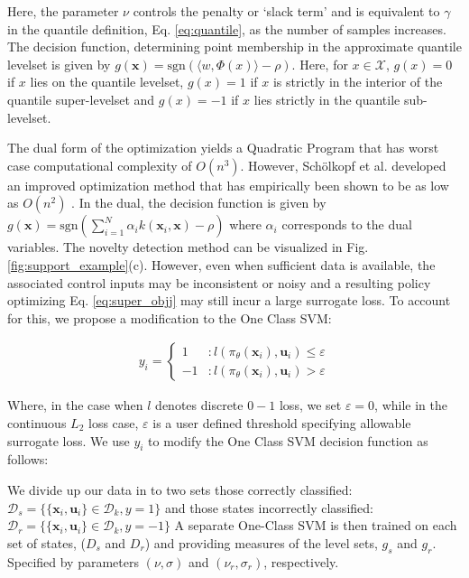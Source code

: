\documentclass[10pt, conference]{ieeeconf}      %
\newcommand{\bu}{\mathbf{u}}
\newcommand{\bx}{\mathbf{x}}
\begin{document}
Here, the parameter $\nu$ controls the penalty or `slack term' and is equivalent to $\gamma$ \cite{vert2006consistency}
in the quantile definition, Eq. \ref{eq:quantile}, as the number of samples increases. The decision
function, determining point membership in the approximate quantile levelset is given by $g(\bx) = \mbox{sgn}(\langle w,\Phi(x) \rangle-\rho)$. Here, for $x\in \mathcal{X}$, $g(x)=0$ if $x$ lies on the quantile levelset,
$g(x) = 1$ if $x$ is strictly in the interior of the quantile super-levelset and $g(x) = -1$ 
if $x$ lies strictly in the quantile sub-levelset. 



The dual form of the optimization yields a Quadratic Program 
that has worst case computational complexity of $O(n^3)$. However, Sch{\"o}lkopf et al. developed an improved optimization method that has empirically been shown to be as low as $O(n^2)$ \cite{scholkopf2001estimating}. In the dual, the decision function is given by $g(\bx) = \mbox{sgn}(\sum^N_{i=1}\alpha_i k(\bx_i,\bx)-\rho)$ where $\alpha_i$ corresponds to the dual variables.  The novelty detection method can be visualized in Fig. \ref{fig:support_example}(c). 
However, even when sufficient data is available, the associated control inputs may be inconsistent or noisy and a resulting policy
optimizing Eq. \ref{eq:super_objj} may still incur a large surrogate loss. To account for this, we propose a
modification to the One Class SVM:

\vspace{-2ex}
\begin{align}
y_i = \left\{
     \begin{array}{lr}
         1 & : l(\pi_{\theta}(\bx_i),\bu_i)\le \varepsilon\\
         -1 & : l(\pi_{\theta}(\bx_i),\bu_i)>\varepsilon
     \end{array}
   \right.
\end{align}

Where, in the case when $l$ denotes discrete $0-1$ loss, we set $\varepsilon = 0$, while in the continuous $L_2$ loss
case, $\varepsilon$ is a user defined threshold specifying allowable surrogate loss.
We use $y_i$ to modify the One Class SVM decision function as follows: 


We divide up our data in to two sets those correctly classified: $\mathcal{D}_{s}=\{\lbrace \bx_i,\bu_i \rbrace \in \mathcal{D}_{k}, y=1\}$ and those states incorrectly classified: $\mathcal{D}_{r}=\{\lbrace \bx_i,\bu_i \rbrace \in \mathcal{D}_{k}, y=-1\}$
A separate One-Class SVM is then trained on each set of states, ($D_{s}$ and $D_{r}$) and providing measures of the level sets, $g_{s}$ and $g_{r}$. Specified by parameters $(\nu,\sigma)$ and $(\nu_r,\sigma_r)$, respectively. 
\end{document}
